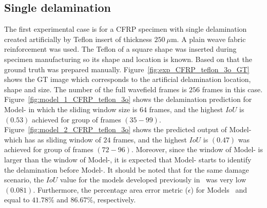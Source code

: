 \subsection{Single delamination}
The first experimental case is for a CFRP specimen with single delamination created artificially by Teflon insert of thickness \(250\ \mu\)m. 
A plain weave fabric reinforcement was used.
The Teflon of a square shape was inserted during specimen manufacturing so its shape and location is known.
Based on that the ground truth was prepared manually.
Figure~\ref{fig:exp_CFRP_teflon_3o_GT} shows the GT image which corresponds to the artificial delamination location, shape and size.
The number of the full wavefield frames is \(256\) frames in this case.
Figure~\ref{fig:model_1_CFRP_teflon_3o} shows the delamination prediction for Model- in which the sliding window size is \(64\) frames, and the highest \(IoU\) is \((0.53)\) achieved for group of frames \((35-99)\).
Figure~\ref{fig:model_2_CFRP_teflon_3o} shows the predicted output of Model- which has as sliding window of \(24\) frames, and the highest \(IoU\) is \((0.47)\) was achieved for group of frames \((72-96)\).
Moreover, since the window of Model- is larger than the window of Model-, it is expected that Model- starts to identify the delamination before Model-.
It should be noted that for the same damage scenario, the \(IoU\) value for the models developed previously in~\cite{Ijjeh2021} was very low \((0.081)\).
Furthermore, the percentage area error metric (\(\epsilon\)) for Models~ and~ equal to \(41.78 \%\) and \(86.67\%\), respectively.
